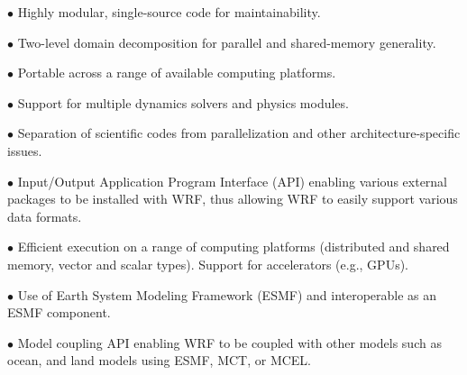 \begin{description}
\setlength{\itemsep}{-5pt}
\item{$\bullet$} Highly modular, single-source code for maintainability.
%
\item{$\bullet$} Two-level domain decomposition for parallel and 
shared-memory generality.
%
\item{$\bullet$} Portable across a range of available computing platforms.
%
\item{$\bullet$} Support for multiple dynamics solvers and physics modules.
%
\item{$\bullet$}
Separation of scientific codes from parallelization and other 
architecture-specific issues.
%
\item{$\bullet$}
Input/Output Application Program Interface (API) enabling various external
packages to be installed with WRF, thus allowing WRF
to easily support various data formats.
%
\item{$\bullet$}
Efficient execution on a range of computing platforms
(distributed and shared memory, vector
and scalar types). Support for accelerators (e.g., GPUs).
%
\item{$\bullet$}
Use of Earth System Modeling Framework (ESMF) and interoperable as an ESMF
component.
%
\item{$\bullet$}
Model coupling API enabling WRF to be coupled with other models such as
ocean, and land models using ESMF, MCT, or MCEL.
\end{description}
